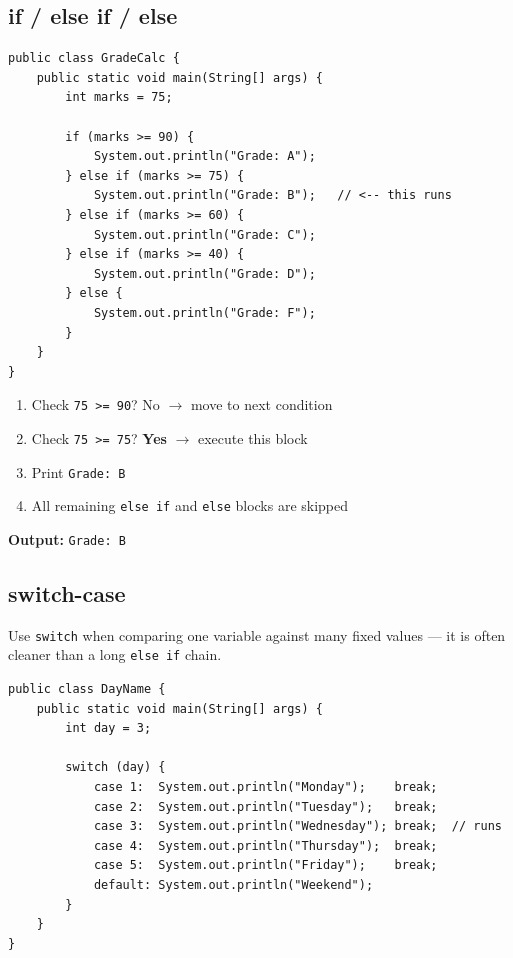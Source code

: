 \documentclass[12pt,a4paper,oneside]{book}
\begin{document}
\subsection{if / else if / else}

\begin{lstlisting}[caption={Grade Calculator using if-else chain}]
public class GradeCalc {
    public static void main(String[] args) {
        int marks = 75;

        if (marks >= 90) {
            System.out.println("Grade: A");
        } else if (marks >= 75) {
            System.out.println("Grade: B");   // <-- this runs
        } else if (marks >= 60) {
            System.out.println("Grade: C");
        } else if (marks >= 40) {
            System.out.println("Grade: D");
        } else {
            System.out.println("Grade: F");
        }
    }
}
\end{lstlisting}

\begin{dryrun}[Dry Run: marks = 75]
\begin{enumerate}
  \item Check \texttt{75 >= 90}? No $\to$ move to next condition
  \item Check \texttt{75 >= 75}? \textbf{Yes} $\to$ execute this block
  \item Print \texttt{Grade: B}
  \item All remaining \texttt{else if} and \texttt{else} blocks are skipped
\end{enumerate}
\textbf{Output:} \texttt{Grade: B}
\end{dryrun}

\subsection{switch-case}

Use \texttt{switch} when comparing one variable against many fixed values --- it is often cleaner than a long \texttt{else if} chain.

\begin{lstlisting}[caption={Day Name using switch-case}]
public class DayName {
    public static void main(String[] args) {
        int day = 3;

        switch (day) {
            case 1:  System.out.println("Monday");    break;
            case 2:  System.out.println("Tuesday");   break;
            case 3:  System.out.println("Wednesday"); break;  // runs
            case 4:  System.out.println("Thursday");  break;
            case 5:  System.out.println("Friday");    break;
            default: System.out.println("Weekend");
        }
    }
}
\end{lstlisting}
\end{document}
